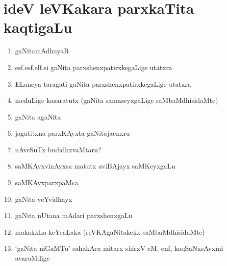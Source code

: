 \chapter{ideV leVKakara parxkaTita kaqtigaLu}

\begin{enumerate}
\renewcommand{\labelenumi}{\rm(\theenumi)}
\item gaNitamAdhuyaR
  
\item esf.esf.elf.si gaNita parxshenxpatirxkegaLige utatxra

\item ELaneya taragati gaNita parxshenxpatirxkegaLige utatxra

\item meduLige kasaratutx (gaNita samaseyxgaLige saMbaMdhisidaMte)

\item gaNita agaNita

\item jagatitxna parxKAyxta gaNitajacnxru

\item nAveSuTx budidhxvaMtaru?

\item saMKAyxvinAyxsa matutx aviBAjayx saMKeyxgaLu 

\item saMKAyxparxpaMca

\item gaNita veYvidhayx

\item gaNita nUtana mAdari parxshenxgaLu

\item makakxLa keYcaLaka (reVKAgaNitakekx saMbaMdhisidaMte)

\item `gaNita niGaMTu' sahakAra mitarx shirxV eM. enf, kaqSaNxsAvxmi avaroMdige  
  
\end{enumerate}
